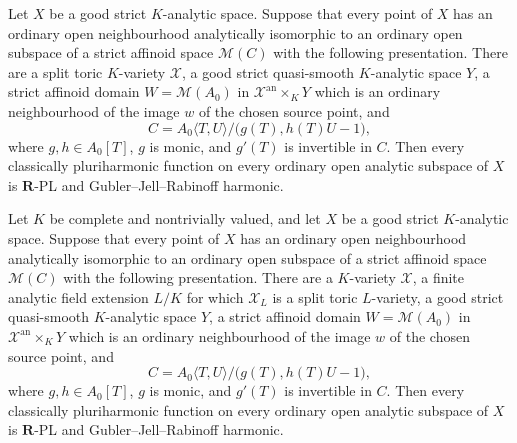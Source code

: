 \begin{corollary}
\label{cor:p061-analytic-standard-etale-all-orbits}
Let \(X\) be a good strict \(K\)-analytic space.  Suppose that every
point of \(X\) has an ordinary open neighbourhood analytically isomorphic
to an ordinary open subspace of a strict affinoid space \(\mathcal M(C)\)
with the following presentation.  There are a split toric \(K\)-variety
\(\mathcal X\), a good strict quasi-smooth \(K\)-analytic space \(Y\), a
strict affinoid domain \(W=\mathcal M(A_0)\) in
\(\mathcal X^{\mathrm{an}}\times_KY\) which is an ordinary neighbourhood
of the image \(w\) of the chosen source point, and
\[
 C=A_0\langle T,U\rangle/
      \bigl(g(T),h(T)U-1\bigr),
\]
where \(g,h\in A_0[T]\), \(g\) is monic, and \(g'(T)\) is invertible in
\(C\).  Then every classically pluriharmonic function on every ordinary
open analytic subspace of \(X\) is \(\mathbf R\)-PL and
Gubler--Jell--Rabinoff harmonic.
\end{corollary}

\begin{corollary}
\label{cor:p061-analytic-standard-etale-finite-split-forms}
Let \(K\) be complete and nontrivially valued, and let \(X\) be a good
strict \(K\)-analytic space.  Suppose that every point of \(X\) has an
ordinary open neighbourhood analytically isomorphic to an ordinary open
subspace of a strict affinoid space \(\mathcal M(C)\) with the following
presentation.  There are a \(K\)-variety \(\mathcal X\), a finite analytic
field extension \(L/K\) for which \(\mathcal X_L\) is a split toric
\(L\)-variety, a good strict quasi-smooth \(K\)-analytic space \(Y\), a
strict affinoid domain \(W=\mathcal M(A_0)\) in
\(\mathcal X^{\mathrm{an}}\times_KY\) which is an ordinary neighbourhood
of the image \(w\) of the chosen source point, and
\[
 C=A_0\langle T,U\rangle/
      \bigl(g(T),h(T)U-1\bigr),
\]
where \(g,h\in A_0[T]\), \(g\) is monic, and \(g'(T)\) is invertible in
\(C\).  Then every classically pluriharmonic function on every ordinary
open analytic subspace of \(X\) is \(\mathbf R\)-PL and
Gubler--Jell--Rabinoff harmonic.
\end{corollary}

